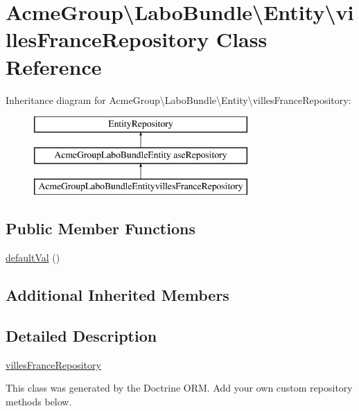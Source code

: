 \hypertarget{class_acme_group_1_1_labo_bundle_1_1_entity_1_1villes_france_repository}{\section{Acme\+Group\textbackslash{}Labo\+Bundle\textbackslash{}Entity\textbackslash{}villes\+France\+Repository Class Reference}
\label{class_acme_group_1_1_labo_bundle_1_1_entity_1_1villes_france_repository}
}
Inheritance diagram for Acme\+Group\textbackslash{}Labo\+Bundle\textbackslash{}Entity\textbackslash{}villes\+France\+Repository\+:\begin{figure}[H]
\begin{center}
\leavevmode
\includegraphics[height=3.000000cm]{class_acme_group_1_1_labo_bundle_1_1_entity_1_1villes_france_repository}
\end{center}
\end{figure}
\subsection*{Public Member Functions}
\begin{DoxyCompactItemize}
\item 
\hyperlink{class_acme_group_1_1_labo_bundle_1_1_entity_1_1villes_france_repository_a2c8f4446c3bc37c9c37f2ea439ba4f34}{default\+Val} ()
\end{DoxyCompactItemize}
\subsection*{Additional Inherited Members}


\subsection{Detailed Description}
\hyperlink{class_acme_group_1_1_labo_bundle_1_1_entity_1_1villes_france_repository}{villes\+France\+Repository}

This class was generated by the Doctrine O\+R\+M. Add your own custom repository methods below. 

